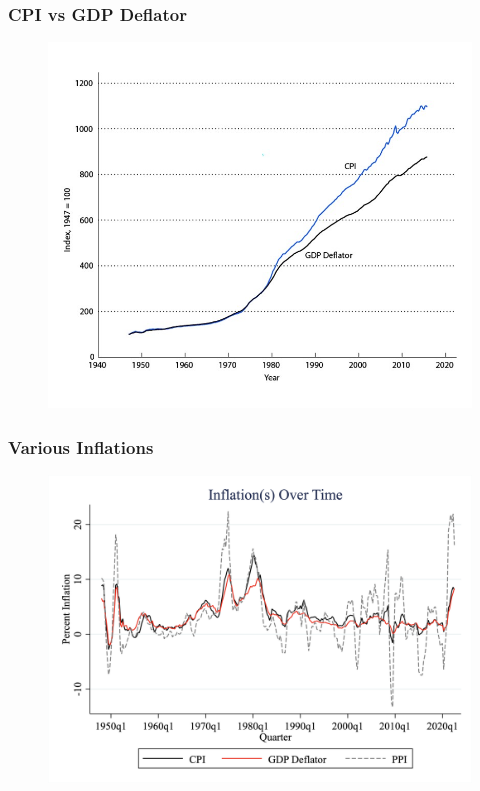 \documentclass{beamer}
\begin{document}
\begin{frame}
\frametitle[alignment=center]{CPI vs GDP Deflator}
\begin{figure}
\includegraphics[scale=0.6]{Figures/W_Fig_2pt3.png}
\end{figure}
\end{frame}


\begin{frame}
\frametitle[alignment=center]{Various Inflations}
\begin{figure}
\includegraphics[scale=0.18]{Figures/Fig_CPIs.png}
\end{figure}
\end{frame}
\end{document}

